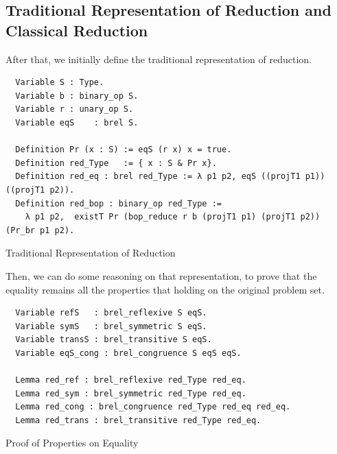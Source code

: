 \documentclass[a4paper,12pt,twoside,openright]{report}
\begin{document}
\subsection{Traditional Representation of Reduction and Classical Reduction}
After that, we initially define the traditional representation of reduction.

\begin{listing}[H]
\begin{verbatim}
  Variable S : Type. 
  Variable b : binary_op S.
  Variable r : unary_op S.
  Variable eqS    : brel S.
  
  Definition Pr (x : S) := eqS (r x) x = true.  
  Definition red_Type   := { x : S & Pr x}.
  Definition red_eq : brel red_Type := λ p1 p2, eqS ((projT1 p1)) ((projT1 p2)).
  Definition red_bop : binary_op red_Type :=
    λ p1 p2,  existT Pr (bop_reduce r b (projT1 p1) (projT1 p2)) (Pr_br p1 p2).
\end{verbatim}
\caption{Traditional Representation of Reduction} 
\label{coq:def:traditional_representation}
\end{listing}

Then, we can do some reasoning on that representation, to prove that the equality remains all the properties that holding on the original problem set.
\begin{listing}[H]
\begin{verbatim}
  Variable refS   : brel_reflexive S eqS. 
  Variable symS   : brel_symmetric S eqS. 
  Variable transS : brel_transitive S eqS.
  Variable eqS_cong : brel_congruence S eqS eqS.
  
  Lemma red_ref : brel_reflexive red_Type red_eq. 
  Lemma red_sym : brel_symmetric red_Type red_eq. 
  Lemma red_cong : brel_congruence red_Type red_eq red_eq. 
  Lemma red_trans : brel_transitive red_Type red_eq. 
\end{verbatim}
\caption{Proof of Properties on Equality} 
\label{coq:proof:tr_eq}
\end{listing}
\end{document}
